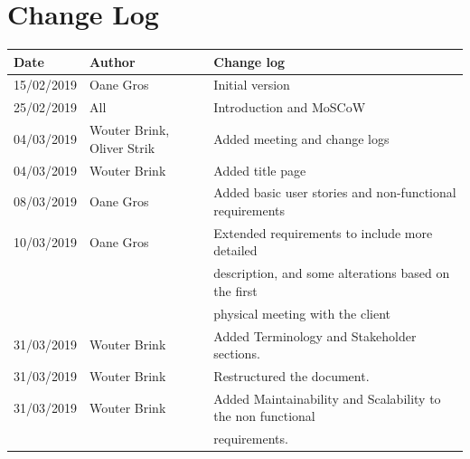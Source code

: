 \documentclass{article}
\begin{document}
\section{Change Log}
\begin{center}
 \begin{tabular}{ | l | l | l | }
  \hline
  \bf{Date} & \bf{Author} & \bf{Change log} \\
  \hline
  15/02/2019 & Oane Gros & Initial version \\
  \hline
  25/02/2019 & All & Introduction and MoSCoW \\
  \hline
  04/03/2019 & Wouter Brink, Oliver Strik & Added meeting and change logs\\
  \hline
  04/03/2019 & Wouter Brink & Added title page \\
  \hline
  08/03/2019 & Oane Gros & Added basic user stories and non-functional requirements \\
  \hline
  10/03/2019 & Oane Gros & Extended requirements to include more detailed \\  & & description,
   and some alterations based on the first \\ & & physical meeting with the client \\
  \hline
  31/03/2019 & Wouter Brink & Added Terminology and Stakeholder sections. \\
  \hline
  31/03/2019 & Wouter Brink & Restructured the document. \\
  \hline
  31/03/2019 & Wouter Brink & Added Maintainability and Scalability to the non functional \\
  & & requirements. \\
  \hline
 \end{tabular}
\end{center}
\end{document}
